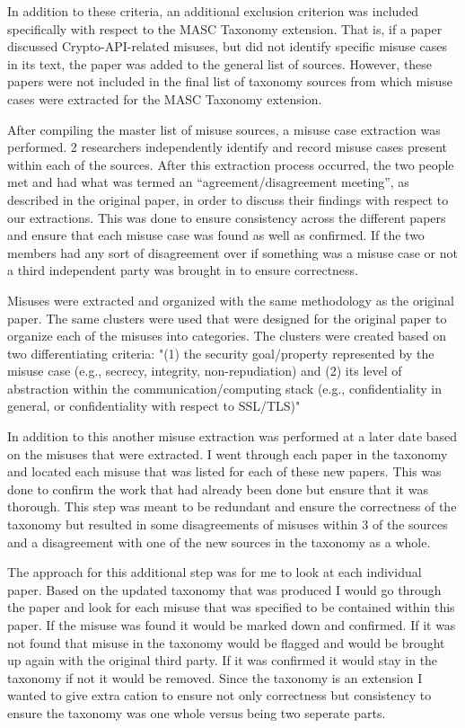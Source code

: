 In addition to these criteria, an additional exclusion criterion was included specifically with respect to the MASC Taxonomy extension.  That is, if a paper discussed Crypto-API-related misuses, but did not identify specific misuse cases in its text, the paper was added to the general list of sources.  However, these papers were not included in the final list of taxonomy sources from which misuse cases were extracted for the MASC Taxonomy extension.

After compiling the master list of misuse sources, a misuse case extraction was performed. 2 researchers independently identify and record misuse cases present within each of the sources. After this extraction process occurred, the two people  met and had what was termed an “agreement/disagreement meeting”, as described in the original paper, in order to discuss their findings with respect to our extractions.  This was done to ensure consistency across the different papers and ensure that each misuse case was found as well as confirmed. If the two members had any sort of disagreement over if something was a misuse case or not a third independent party was brought in to ensure correctness. 

Misuses were extracted and organized with the same methodology as the original paper. The same clusters were used that were designed for the original paper to organize each of the misuses into categories. The clusters were created based on two differentiating criteria: "(1) the security goal/property represented by the misuse case  (e.g., secrecy, integrity, non-repudiation) and (2) its level of abstraction within the communication/computing stack (e.g., confidentiality in general, or confidentiality with respect to SSL/TLS)"
    
In addition to this another misuse extraction was performed at a later date based on the misuses that were extracted. I went through each paper in the taxonomy and located each misuse that was listed for each of these new papers. This was done to confirm the work that had already been done but ensure that it was thorough. This step was meant to be redundant and ensure the correctness of the taxonomy but resulted in some disagreements of misuses within 3 of the sources and a disagreement with one of the new sources in the taxonomy as a whole. 

The approach for this additional step was for me to look at each individual paper. Based on the updated taxonomy that was produced I would go through the paper and look for each misuse that was specified to be contained within this paper. If the misuse was found it would be marked down and confirmed. If it was not found that misuse in the taxonomy would be flagged and would be brought up again with the original third party. If it was confirmed it would stay in the taxonomy if not it would be removed. Since the taxonomy is an extension I wanted to give extra cation to ensure not only correctness but consistency to ensure the taxonomy was one whole versus being two seperate parts.
  
